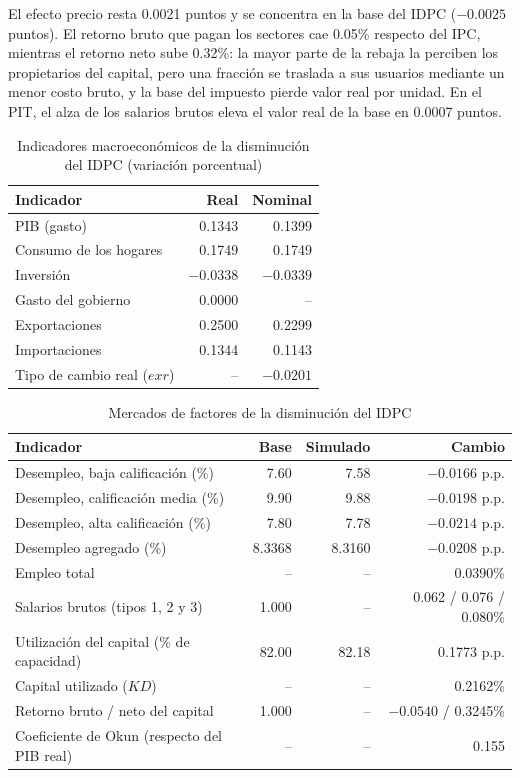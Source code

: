\documentclass[11pt]{article}
\begin{document}
El efecto precio resta 0.0021 puntos y se concentra en la base del IDPC ($-0.0025$ puntos). El retorno bruto que pagan los sectores cae 0.05\% respecto del IPC, mientras el retorno neto sube 0.32\%: la mayor parte de la rebaja la perciben los propietarios del capital, pero una fracción se traslada a sus usuarios mediante un menor costo bruto, y la base del impuesto pierde valor real por unidad. En el PIT, el alza de los salarios brutos eleva el valor real de la base en 0.0007 puntos.

\begin{table}[H]
\centering
\caption{Indicadores macroeconómicos de la disminución del IDPC (variación porcentual)}
\begin{tabular}{|l|r|r|}
  \hline
  Indicador & Real & Nominal \\
  \hline
  PIB (gasto) & 0.1343 & 0.1399 \\
  \hline
  Consumo de los hogares & 0.1749 & 0.1749 \\
  \hline
  Inversión & $-0.0338$ & $-0.0339$ \\
  \hline
  Gasto del gobierno & 0.0000 & -- \\
  \hline
  Exportaciones & 0.2500 & 0.2299 \\
  \hline
  Importaciones & 0.1344 & 0.1143 \\
  \hline
  Tipo de cambio real ($exr$) & -- & $-0.0201$ \\
  \hline
\end{tabular}
\end{table}

\begin{table}[H]
\centering
\caption{Mercados de factores de la disminución del IDPC}
\small
\begin{tabular}{|l|r|r|r|}
  \hline
  Indicador & Base & Simulado & Cambio \\
  \hline
  Desempleo, baja calificación (\%) & 7.60 & 7.58 & $-0.0166$ p.p. \\
  \hline
  Desempleo, calificación media (\%) & 9.90 & 9.88 & $-0.0198$ p.p. \\
  \hline
  Desempleo, alta calificación (\%) & 7.80 & 7.78 & $-0.0214$ p.p. \\
  \hline
  Desempleo agregado (\%) & 8.3368 & 8.3160 & $-0.0208$ p.p. \\
  \hline
  Empleo total & -- & -- & 0.0390\% \\
  \hline
  Salarios brutos (tipos 1, 2 y 3) & 1.000 & -- & 0.062 / 0.076 / 0.080\% \\
  \hline
  Utilización del capital (\% de capacidad) & 82.00 & 82.18 & 0.1773 p.p. \\
  \hline
  Capital utilizado ($KD$) & -- & -- & 0.2162\% \\
  \hline
  Retorno bruto / neto del capital & 1.000 & -- & $-0.0540$ / 0.3245\% \\
  \hline
  Coeficiente de Okun (respecto del PIB real) & -- & -- & 0.155 \\
  \hline
\end{tabular}
\end{table}
\end{document}
